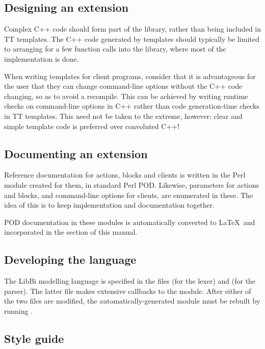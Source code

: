 \subsection{Designing an extension\label{Designing_an_extension}}

Complex C++ code should form part of the library, rather than being included
in TT templates. The C++ code generated by templates should typically be
limited to arranging for a few function calls into the library, where most of
the implementation is done.

When writing templates for client programs, consider that it is advantageous
for the user that they can change command-line options without the C++ code
changing, so as to avoid a recompile. This can be achieved by writing runtime
checks on command-line options in C++ rather than code generation-time checks
in TT templates. This need not be taken to the extreme, however: clear and
simple template code is preferred over convoluted C++!

\subsection{Documenting an extension\label{Documenting_an_extension}}

Reference documentation for actions, blocks and clients is written in the Perl
module created for them, in standard Perl POD. Likewise, parameters for
actions and blocks, and command-line options for clients, are enumerated in
these. The idea of this is to keep implementation and documentation together.

POD documentation in these modules is automatically converted to \LaTeX\ and
incorporated in the  section of this
manual.

\subsection{Developing the language\label{Developing_the_language}}

The LibBi modelling language is specified in the files 
(for the lexer) and  (for the parser). The latter file makes
extensive callbacks to the  module. After either of the two
files are modified, the automatically-generated  module must
be rebuilt by running .

\subsection{Style guide\label{Developer_style_guide}}

